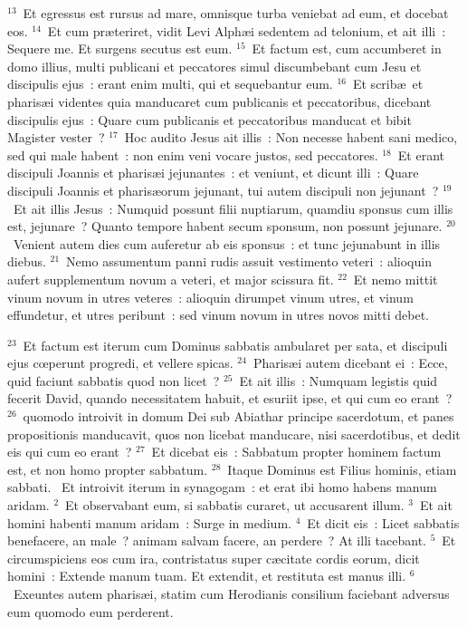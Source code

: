 ${}^{13}$~Et egressus est rursus ad mare, omnisque turba veniebat ad eum, et docebat eos.
${}^{14}$~Et cum pr\ae teriret, vidit Levi Alph\ae i sedentem ad telonium, et ait illi~: Sequere me. Et surgens secutus est eum.
${}^{15}$~Et factum est, cum accumberet in domo illius, multi publicani et peccatores simul discumbebant cum Jesu et discipulis ejus~: erant enim multi, qui et sequebantur eum.
${}^{16}$~Et scrib\ae\ et pharis\ae i videntes quia manducaret cum publicanis et peccatoribus, dicebant discipulis ejus~: Quare cum publicanis et peccatoribus manducat et bibit Magister vester~?
${}^{17}$~Hoc audito Jesus ait illis~: Non necesse habent sani medico, sed qui male habent~: non enim veni vocare justos, sed peccatores.
${}^{18}$~Et erant discipuli Joannis et pharis\ae i jejunantes~: et veniunt, et dicunt illi~: Quare discipuli Joannis et pharis\ae orum jejunant, tui autem discipuli non jejunant~?
${}^{19}$~Et ait illis Jesus~: Numquid possunt filii nuptiarum, quamdiu sponsus cum illis est, jejunare~? Quanto tempore habent secum sponsum, non possunt jejunare.
${}^{20}$~Venient autem dies cum auferetur ab eis sponsus~: et tunc jejunabunt in illis diebus.
${}^{21}$~Nemo assumentum panni rudis assuit vestimento veteri~: alioquin aufert supplementum novum a veteri, et major scissura fit.
${}^{22}$~Et nemo mittit vinum novum in utres veteres~: alioquin dirumpet vinum utres, et vinum effundetur, et utres peribunt~: sed vinum novum in utres novos mitti debet.


${}^{23}$~Et factum est iterum cum Dominus sabbatis ambularet per sata, et discipuli ejus cœperunt progredi, et vellere spicas.
${}^{24}$~Pharis\ae i autem dicebant ei~: Ecce, quid faciunt sabbatis quod non licet~?
${}^{25}$~Et ait illis~: Numquam legistis quid fecerit David, quando necessitatem habuit, et esuriit ipse, et qui cum eo erant~?
${}^{26}$~quomodo introivit in domum Dei sub Abiathar principe sacerdotum, et panes propositionis manducavit, quos non licebat manducare, nisi sacerdotibus, et dedit eis qui cum eo erant~?
${}^{27}$~Et dicebat eis~: Sabbatum propter hominem factum est, et non homo propter sabbatum.
${}^{28}$~Itaque Dominus est Filius hominis, etiam sabbati.
~Et introivit iterum in synagogam~: et erat ibi homo habens manum aridam.
${}^{2}$~Et observabant eum, si sabbatis curaret, ut accusarent illum.
${}^{3}$~Et ait homini habenti manum aridam~: Surge in medium.
${}^{4}$~Et dicit eis~: Licet sabbatis benefacere, an male~? animam salvam facere, an perdere~? At illi tacebant.
${}^{5}$~Et circumspiciens eos cum ira, contristatus super c\ae citate cordis eorum, dicit homini~: Extende manum tuam. Et extendit, et restituta est manus illi.
${}^{6}$~Exeuntes autem pharis\ae i, statim cum Herodianis consilium faciebant adversus eum quomodo eum perderent.


